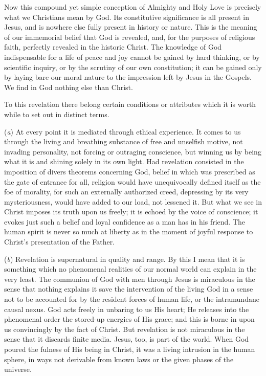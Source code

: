 \documentclass[12pt,a5paper]{article}
\begin{document}
Now this compound yet simple conception of Almighty and Holy Love is precisely what we Christians mean by God. Its constitutive significance is all present in Jesus, and is nowhere else fully present in history or nature. This is the meaning of our immemorial belief that God is revealed, and, for the purposes of religious faith, perfectly revealed in the historic Christ. The knowledge of God indispensable for a life of peace and joy cannot be gained by hard thinking, or by scientific inquiry, or by the scrutiny of our own constitution; it can be gained only by laying bare our moral nature to the impression left by Jesus in the Gospels. We find in God nothing else than Christ. 

To this revelation there belong certain conditions or attributes which it is worth while to set out in distinct terms. 

(\textit{a}) At every point it is mediated through ethical experience. It comes to us through the living and breathing substance of free and unselfish motive, not invading personality, not forcing or outraging conscience, but winning us by being what it is and shining solely in its own light. Had revelation consisted in the imposition of divers theorems concerning God, belief in which was prescribed as the gate of entrance for all, religion would have unequivocally defined itself as the foe of morality, for such an externally authorized creed, depressing by its very mysteriousness, would have added to our load, not lessened it. But what we see in Christ imposes its truth upon us freely; it is echoed by the voice of conscience; it evokes just such a belief and loyal confidence as a man has in his friend. The human spirit is never so much at liberty as in the moment of joyful response to Christ's presentation of the Father. 

(\textit{b}) Revelation is supernatural in quality and range. By this I mean that it is something which no phenomenal realities of our normal world can explain in the very least. The communion of God with men through Jesus is miraculous in the sense that nothing explains it save the intervention of the living God in a sense not to be accounted for by the resident forces of human life, or the intramundane causal nexus. God acts freely in unbaring to us His heart; He releases into the phenomenal order the stored-up energies of His grace; and this is borne in upon us convincingly by the fact of Christ. But revelation is not miraculous in the sense that it discards finite media. Jesus, too, is part of the world. When God poured the fulness of His being in Christ, it was a living intrusion in the human sphere, in ways not derivable from known laws or the given phases of the universe.
 
\end{document}
